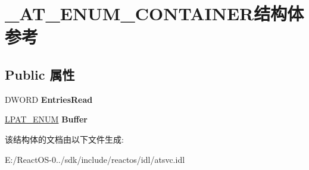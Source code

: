 \hypertarget{struct___a_t___e_n_u_m___c_o_n_t_a_i_n_e_r}{}\section{\+\_\+\+A\+T\+\_\+\+E\+N\+U\+M\+\_\+\+C\+O\+N\+T\+A\+I\+N\+E\+R结构体 参考}
\label{struct___a_t___e_n_u_m___c_o_n_t_a_i_n_e_r}
\subsection*{Public 属性}
\begin{DoxyCompactItemize}
\item 
\mbox{\label{struct___a_t___e_n_u_m___c_o_n_t_a_i_n_e_r_a18a49b33be649f7887c8a142c347928f}} 
D\+W\+O\+RD {\bfseries Entries\+Read}
\item 
\mbox{\label{struct___a_t___e_n_u_m___c_o_n_t_a_i_n_e_r_abc09439a76e7e3955fb0bc667b033c51}} 
\hyperlink{struct___a_t___e_n_u_m}{L\+P\+A\+T\+\_\+\+E\+N\+UM} {\bfseries Buffer}
\end{DoxyCompactItemize}


该结构体的文档由以下文件生成\+:\begin{DoxyCompactItemize}
\item 
E\+:/\+React\+O\+S-\/0../sdk/include/reactos/idl/atsvc.\+idl\end{DoxyCompactItemize}
